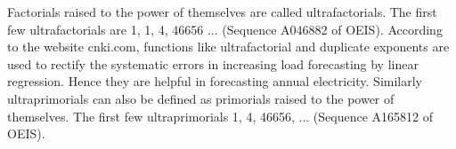 \documentclass[12pt]{article}
\begin{document}
Factorials raised to the power of themselves are called ultrafactorials. The first few ultrafactorials are 1, 1, 4, 46656 ... (Sequence A046882 of OEIS). According to the website cnki.com, functions like ultrafactorial and duplicate exponents are used to rectify the systematic errors in increasing load forecasting by linear regression. Hence they are helpful in forecasting annual electricity. Similarly ultraprimorials can also be defined as primorials raised to the power of themselves. The first few ultraprimorials 1, 4, 46656, ... (Sequence A165812 of OEIS).
\end{document}
